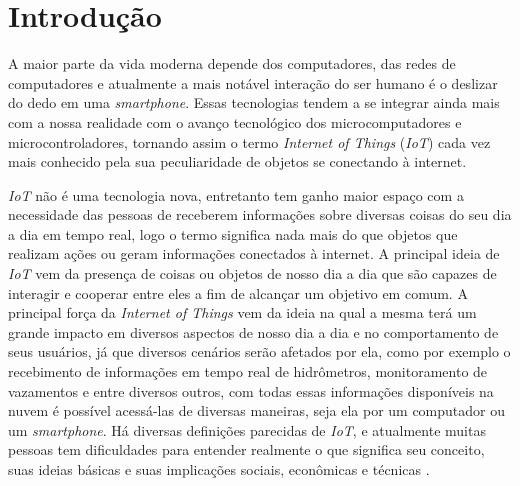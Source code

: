 \chapter[Introdução]{Introdução}
\par A maior parte da vida moderna depende dos computadores, das redes de computadores e atualmente a mais notável interação do ser humano é o deslizar do dedo em uma \emph{smartphone}. Essas tecnologias tendem a se integrar ainda mais com a nossa realidade com o avan\c{c}o tecnol\'ogico dos microcomputadores e microcontroladores, tornando assim o termo \emph{Internet of Things} (\emph{IoT}) cada vez mais conhecido pela sua peculiaridade de objetos se conectando \`a internet.

\par \emph{IoT} não é uma tecnologia nova, entretanto tem ganho maior espa\c{c}o com a necessidade das pessoas de receberem informa\c{c}\~oes sobre diversas coisas do seu dia a dia em tempo real, logo o termo significa nada mais do que objetos que realizam a\c{c}\~oes ou geram informa\c{c}\~oes conectados \`a internet. A principal ideia de \emph{IoT} vem da presença de coisas ou objetos de nosso dia a dia que são capazes de interagir e cooperar entre eles a fim de alcançar um objetivo em comum. A principal força da \emph{Internet of Things} vem da ideia na qual a mesma terá um grande impacto em diversos aspectos de nosso dia a dia e no comportamento de seus usuários, já que diversos cenários serão afetados por ela, como por exemplo o recebimento de informa\c{c}\~oes em tempo real de hidr\^ometros, monitoramento de vazamentos e entre diversos outros, com todas essas informa\c{c}\~oes dispon\'iveis na nuvem \'e poss\'ivel acess\'a-las de diversas maneiras, seja ela por um computador ou um \emph{smartphone}. Há diversas definições parecidas de \emph{IoT}, e atualmente muitas pessoas tem dificuldades para entender realmente o que significa seu conceito, suas ideias básicas e suas implicações sociais, econômicas e técnicas \cite{iot2005itu}.

